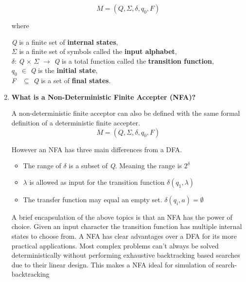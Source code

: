 \documentclass{article}
\begin{document}
\begin{enumerate}
    \[M = (Q, \Sigma, \delta, q_0, F)\]

    where

    \smallskip

    \-\hspace{0.5cm} \textit{Q} is a finite set of \textbf{internal states}, \\
    \-\hspace{0.5cm} $\Sigma$ is a finite set of symbols called the \textbf{input alphabet}, \\
    \-\hspace{0.5cm} $\delta$: \textit{Q} $\times$ $\Sigma$ $\rightarrow$ \textit{Q} is a total function called the 
    \textbf{transition function}, \\
    \-\hspace{0.5cm} \textit{$q_0$ $\in$ Q} is the \textbf{initial state}, \\
    \-\hspace{0.5cm} \textit{F \ $\subseteq$ Q} is a set of \textbf{final states}.



    \medskip

    \item \textbf{What is a Non-Deterministic Finite Accepter (NFA)?}
    
    \medskip

    \-\hspace{0.5cm} A non-deterministic finite acceptor can also be defined with the same formal definition
    of a deterministic finite accepter.
    \[M = (Q, \Sigma, \delta, q_0, F)\]

    \-\hspace{0.5cm} However an NFA has three main differences from a DFA.

    \begin{itemize}
        \item The range of $\delta$ is a subset of \textit{Q}. Meaning the range is $2^\delta$
        \item $\lambda$ is allowed as input for the transition function $\delta(q_1, \lambda)$
        \item The transfer function may equal an empty set. $\delta(q_i, a) = {\emptyset}$
    \end{itemize}

    \-\hspace{0.5cm} A brief encapsulation of the above topics is that an NFA has the power of choice. Given 
    an input character the transition function has multiple internal states to choose from. A NFA has clear advantages over a DFA for its more practical
    applications. Most complex problems can't always be solved deterministically without performing exhaustive
    backtracking based searches due to their linear design. This makes a NFA ideal for simulation
    of search-backtracking




\end{enumerate}
\end{document}
